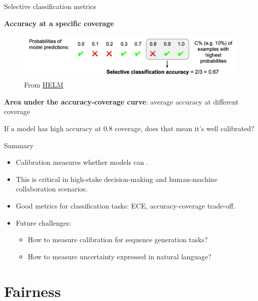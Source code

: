 \documentclass[usenames,dvipsnames,notes,11pt,aspectratio=169,hyperref={colorlinks=true, linkcolor=blue}]{beamer}
\begin{document}
\begin{frame}
    {Selective classification metrics}

    \textbf{Accuracy at a specific coverage}
    \begin{figure}
        \includegraphics[width=\textwidth]{figures/sel-class}
        \caption{From \href{https://arxiv.org/pdf/2211.09110.pdf}{HELM}}
    \end{figure}
    \pause

    \textbf{Area under the accuracy-coverage curve}: average accuracy at different coverage

    \pause
    If a model has high accuracy at 0.8 coverage, does that mean it's well calibrated?
\end{frame}

\begin{frame}
    {Summary}

    \begin{itemize}
        \item Calibration measures whether models can .
        \item This is critical in high-stake decision-making and human-machine collaboration scenarios.
            \pause
        \item Good metrics for classification tasks: ECE, accuracy-coverage trade-off.
        \item Future challenges:\\
            \begin{itemize}
                \item How to measure calibration for sequence generation tasks?
                \item How to measure uncertainty expressed in natural language?
            \end{itemize}
    \end{itemize}
\end{frame}

\section{Fairness}
\end{document}
